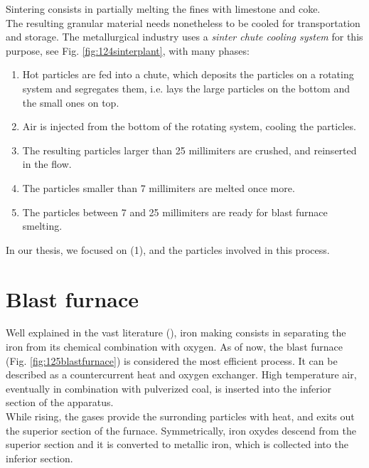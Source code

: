 Sintering consists in partially melting the
fines with limestone and coke.\\
The resulting granular material needs nonetheless to be cooled for
transportation and storage. 
The metallurgical industry uses a \textit{sinter chute cooling system} for this
purpose, see Fig. \ref{fig:124sinterplant}, with many phases:
\begin{enumerate}
  \item{Hot particles are fed into a chute, which deposits the
  particles on a rotating system and segregates them, i.e. lays the large
  particles on the bottom and the small ones on top.}
  \item{Air is injected from the bottom of the rotating system, cooling the
  particles.}
  \item{The resulting particles larger than 25 millimiters are crushed, and
  reinserted in the flow.}
  \item{The particles smaller than 7 millimiters are melted once
  more.}
  \item{The particles between 7 and 25 millimiters are ready for blast furnace
  smelting.}
\end{enumerate}

In our thesis, we focused on (1), and the particles involved in this process.\\

\section{Blast furnace}
\label{sec:blastfurnace}

Well explained in the vast literature (\cite{RefWorks:203}), 
iron making consists in separating the iron from its chemical combination with
oxygen. 
As of now, the blast furnace (Fig. \ref{fig:125blastfurnace}) is considered the
most efficient process.
It can be described as a countercurrent heat and oxygen exchanger.
High temperature air, eventually in combination with pulverized coal, is
inserted into the inferior section of the apparatus.\\



While rising, the gases
provide the surronding particles with heat, and exits out the superior section
of the furnace.
Symmetrically, iron oxydes descend from the superior section and it is converted
to metallic iron, which is collected into the inferior section.\\

